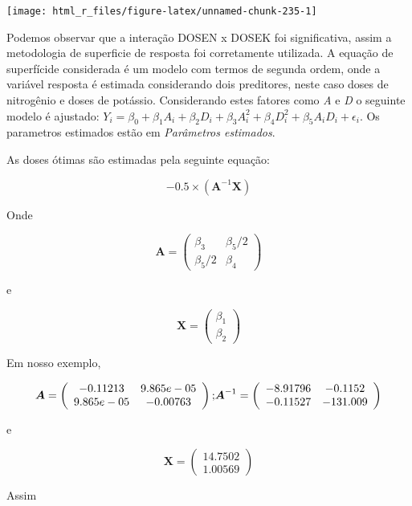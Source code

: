 \documentclass[
]{book}
\begin{document}
\begin{center}\texttt{[image: html\_r\_files/figure-latex/unnamed-chunk-235-1]} \end{center}

Podemos observar que a interação DOSEN x DOSEK foi significativa, assim a metodologia de superficie de resposta foi corretamente utilizada. A equação de superfícide considerada é um modelo com termos de segunda ordem, onde a variável resposta é estimada considerando dois preditores, neste caso doses de nitrogênio e doses de potássio. Considerando estes fatores como \emph{A} e \emph{D} o seguinte modelo é ajustado: \(Y_i = \beta_0 + \beta_1A_i+\beta_2D_i+\beta_3A_i^2+\beta_4D_i^2 +\beta_5A_iD_i+\epsilon_i\). Os parametros estimados estão em \emph{Parâmetros estimados}.

As doses ótimas são estimadas pela seguinte equação: 

\[
- 0.5 \times ({{\boldsymbol{A}}^{ - 1}}{\boldsymbol{X}})
\]

Onde

\[
{\boldsymbol{A}} = \left( {\begin{array}{*{20}{c}}{{\beta _3}}&{{\beta _5}/2}\\{{\beta _5}/2}&{{\beta _4}}\end{array}} \right)
\]

e

\[
{\boldsymbol{X}} = \left( \begin{array}{l}{\beta _1}\\{\beta _2}\end{array} \right)
\]

Em nosso exemplo,

\[
{\boldsymbol{A}} = \left( {\begin{array}{*{20}{c}}{ - 0.11213}&{9.865e - 05}\\{9.865e - 05}&{ - 0.00763}\end{array}} \right){\rm{; }}{{\boldsymbol{A}}^{ - 1}} = \left( {\begin{array}{*{20}{c}}{ - 8.91796}&{ - 0.1152}\\{ - 0.11527}&{ - 131.009}\end{array}} \right)
\]

e

\[
{\boldsymbol{X}} = \left( \begin{array}{l}14.7502\\1.00569\end{array} \right)
\]

Assim
\end{document}
